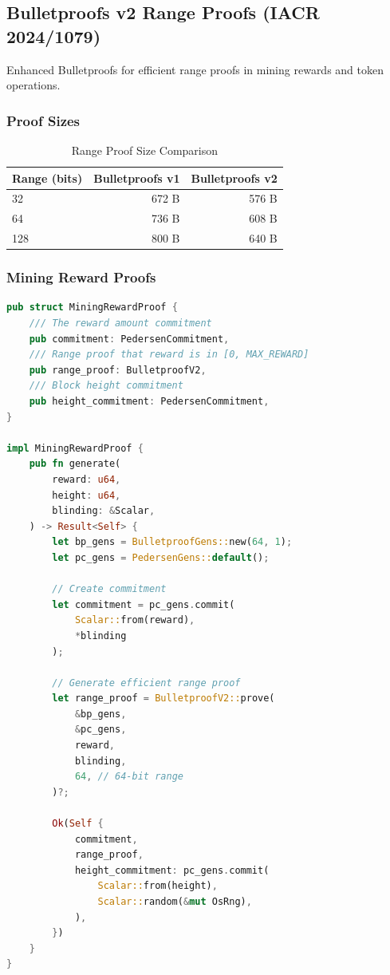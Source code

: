 \documentclass[11pt,a4paper]{article}
\begin{document}
\subsection{Bulletproofs v2 Range Proofs (IACR 2024/1079)}

Enhanced Bulletproofs for efficient range proofs in mining rewards and token operations.

\subsubsection{Proof Sizes}

\begin{table}[h]
\centering
\begin{tabular}{lrr}
\toprule
\textbf{Range (bits)} & \textbf{Bulletproofs v1} & \textbf{Bulletproofs v2} \\
\midrule
32 & 672 B & 576 B \\
64 & 736 B & 608 B \\
128 & 800 B & 640 B \\
\bottomrule
\end{tabular}
\caption{Range Proof Size Comparison}
\end{table}

\subsubsection{Mining Reward Proofs}

\begin{lstlisting}[language=Rust, caption=Mining Reward Range Proof]
pub struct MiningRewardProof {
    /// The reward amount commitment
    pub commitment: PedersenCommitment,
    /// Range proof that reward is in [0, MAX_REWARD]
    pub range_proof: BulletproofV2,
    /// Block height commitment
    pub height_commitment: PedersenCommitment,
}

impl MiningRewardProof {
    pub fn generate(
        reward: u64,
        height: u64,
        blinding: &Scalar,
    ) -> Result<Self> {
        let bp_gens = BulletproofGens::new(64, 1);
        let pc_gens = PedersenGens::default();

        // Create commitment
        let commitment = pc_gens.commit(
            Scalar::from(reward),
            *blinding
        );

        // Generate efficient range proof
        let range_proof = BulletproofV2::prove(
            &bp_gens,
            &pc_gens,
            reward,
            blinding,
            64, // 64-bit range
        )?;

        Ok(Self {
            commitment,
            range_proof,
            height_commitment: pc_gens.commit(
                Scalar::from(height),
                Scalar::random(&mut OsRng),
            ),
        })
    }
}
\end{lstlisting}
\end{document}
